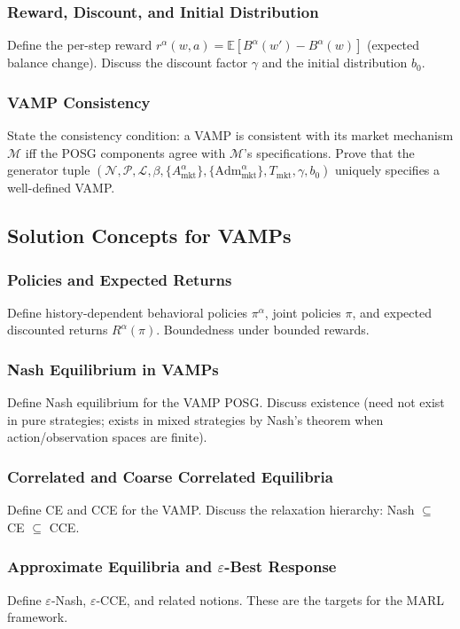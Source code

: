 \subsubsection{Reward, Discount, and Initial Distribution}
Define the per-step reward $r^\alpha(w, a) = \mathbb{E}[B^\alpha(w') - B^\alpha(w)]$ (expected balance change). Discuss the discount factor $\gamma$ and the initial distribution $b_0$.

\subsubsection{VAMP Consistency}
State the consistency condition: a VAMP is consistent with its market mechanism $\mathcal{M}$ iff the POSG components agree with $\mathcal{M}$'s specifications. Prove that the generator tuple $(\mathcal{N}, \mathcal{P}, \mathcal{L}, \beta, \{A^\alpha_{\text{mkt}}\}, \{\text{Adm}^\alpha_{\text{mkt}}\}, T_{\text{mkt}}, \gamma, b_0)$ uniquely specifies a well-defined VAMP.

\subsection{Solution Concepts for VAMPs}

\subsubsection{Policies and Expected Returns}
Define history-dependent behavioral policies $\pi^\alpha$, joint policies $\pi$, and expected discounted returns $R^\alpha(\pi)$. Boundedness under bounded rewards.

\subsubsection{Nash Equilibrium in VAMPs}
Define Nash equilibrium for the VAMP POSG. Discuss existence (need not exist in pure strategies; exists in mixed strategies by Nash's theorem when action/observation spaces are finite).

\subsubsection{Correlated and Coarse Correlated Equilibria}
Define CE and CCE for the VAMP. Discuss the relaxation hierarchy: Nash $\subseteq$ CE $\subseteq$ CCE.

\subsubsection{Approximate Equilibria and $\varepsilon$-Best Response}
Define $\varepsilon$-Nash, $\varepsilon$-CCE, and related notions. These are the targets for the MARL framework.

